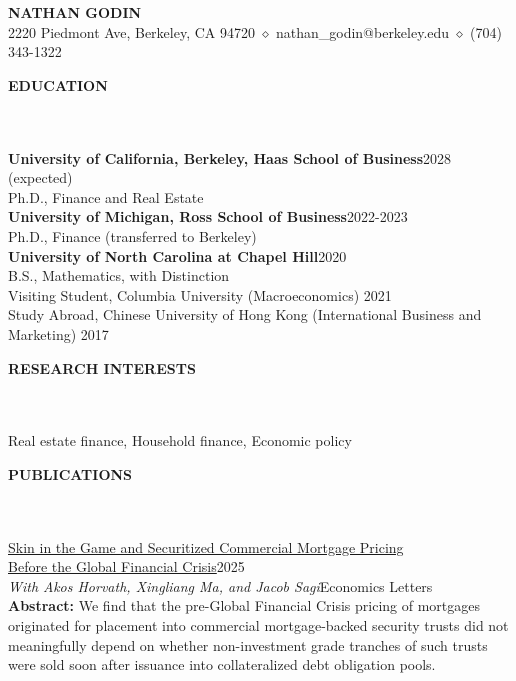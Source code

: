 \documentclass[a4paper]{article}
\newcommand{\lineunder} {
    \vspace*{-8pt} \\
    \hspace*{-18pt} \hrulefill \\
}
\newcommand{\header} [1] {
    {\hspace*{-18pt}\vspace*{1pt} \textbf{\MakeUppercase{#1}}}
    \lineunder
}
\begin{document}
\vspace*{-40pt}



\vspace*{-10pt}
\begin{center}
	{\LARGE \textbf{\MakeUppercase{Nathan Godin}}}\\
\vspace{3mm}
	2220 Piedmont Ave, Berkeley, CA 94720 $\diamond$
nathan\_godin@berkeley.edu $\diamond$
	(704) 343-1322 \\

\end{center}

\header{Education}
\vspace{1mm}
\textbf{University of California, Berkeley, Haas School of Business}\hfill 2028 (expected)\\
Ph.D., Finance and Real Estate \\
\vspace{3mm}
\textbf{University of Michigan, Ross School of Business}\hfill 2022-2023\\
Ph.D., Finance (transferred to Berkeley) \\
\vspace{3mm}
\textbf{University of North Carolina at Chapel Hill}\hfill 2020\\
B.S., Mathematics, with Distinction \\
\vspace{3mm}
Visiting Student, Columbia University (Macroeconomics) \hfill 2021\\ 
Study Abroad, Chinese University of Hong Kong (International Business and Marketing) \hfill 2017\\
\vspace{5mm}

\header{Research Interests}
\vspace{1mm}
Real estate finance, Household finance, Economic policy
\vspace{5mm}

\header{Publications}
\vspace{1mm}
\href{https://papers.ssrn.com/sol3/papers.cfm?abstract_id=5589272}{Skin in the Game and Securitized Commercial Mortgage Pricing \\ Before the Global Financial Crisis}\hfill 2025\\
\textit{With Akos Horvath, Xingliang Ma, and Jacob Sagi}\hfill{Economics Letters}\\
\vspace{3mm}
\textbf{Abstract:} We find that the pre-Global Financial Crisis pricing of mortgages originated for placement into commercial mortgage-backed security trusts did not meaningfully depend on whether non-investment grade tranches of such trusts were sold soon after issuance into collateralized debt obligation pools.\\
\vspace{5mm}
\end{document}
